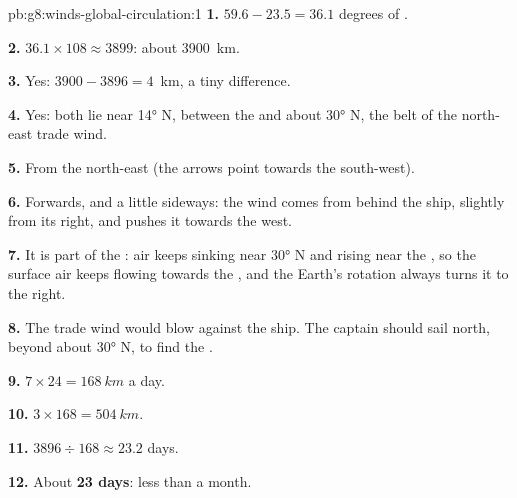 \begin{solution}{pb:g8:winds-global-circulation:1}
\textbf{1.} $59.6 - 23.5 = 36.1$ degrees of .

\textbf{2.} $36.1 \times 108 \approx 3899$: about \qty{3900}{km}.

\textbf{3.} Yes: $3900 - 3896 = 4$~km, a tiny difference.

\textbf{4.} Yes: both lie near \ang{14} N, between the  and about
\ang{30} N, the belt of the north-east trade wind.

\textbf{5.} From the north-east (the arrows point towards the
south-west).

\textbf{6.} Forwards, and a little sideways: the wind comes from behind
the ship, slightly from its right, and pushes it towards the west.

\textbf{7.} It is part of the : air keeps sinking near
\ang{30} N and rising near the , so the surface air keeps flowing
towards the , and the Earth's rotation always turns it to the
right.

\textbf{8.} The trade wind would blow against the ship. The captain
should sail north, beyond about \ang{30} N, to find the .

\textbf{9.} $7 \times 24 = \qty{168}{km}$ a day.

\textbf{10.} $3 \times 168 = \qty{504}{km}$.

\textbf{11.} $3896 \div 168 \approx 23.2$ days.

\textbf{12.} About \textbf{23 days}: less than a month.
\end{solution}
